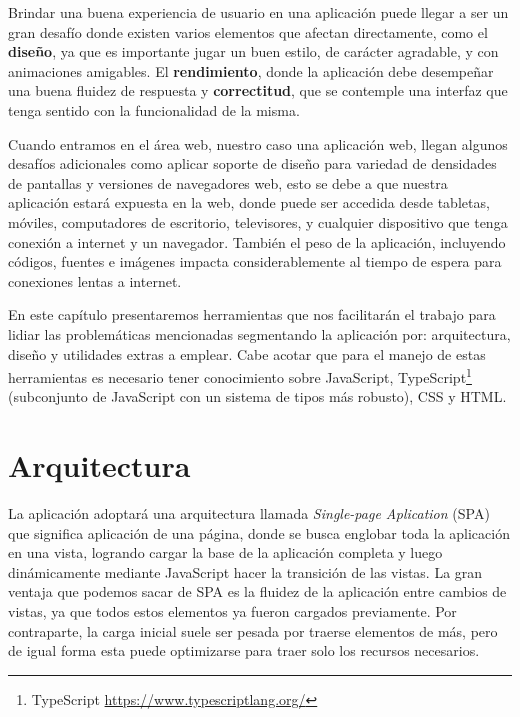 Brindar una buena experiencia de usuario en una aplicación puede llegar a ser un gran desafío donde existen varios elementos que afectan directamente, como el \textbf{diseño}, ya que es importante jugar un buen estilo, de carácter agradable, y con animaciones amigables. El \textbf{rendimiento}, donde la aplicación debe desempeñar una buena fluidez de respuesta y \textbf{correctitud}, que se contemple una interfaz que tenga sentido con la funcionalidad de la misma.

Cuando entramos en el área web, nuestro caso una aplicación web, llegan algunos desafíos adicionales como aplicar soporte de diseño para variedad de densidades de pantallas y versiones de navegadores web, esto se debe a que nuestra aplicación estará expuesta en la web, donde puede ser accedida desde tabletas, móviles, computadores de escritorio, televisores, y cualquier dispositivo que tenga conexión a internet y un navegador. También el peso de la aplicación, incluyendo códigos, fuentes e imágenes impacta considerablemente al tiempo de espera para conexiones lentas a internet.

En este capítulo presentaremos herramientas que nos facilitarán el trabajo para lidiar las problemáticas mencionadas segmentando la aplicación por: arquitectura, diseño y utilidades extras a emplear. Cabe acotar que para el manejo de estas herramientas es necesario tener conocimiento sobre JavaScript, TypeScript\footnote{TypeScript \url{https://www.typescriptlang.org/}} (subconjunto de JavaScript con un sistema de tipos más robusto), CSS y HTML.

\section{Arquitectura}

La aplicación adoptará una arquitectura llamada \textit{Single-page Aplication} \cite{WikiSPA} (SPA) que significa aplicación de una página, donde se busca englobar toda la aplicación en una vista, logrando cargar la base de la aplicación completa y luego dinámicamente mediante JavaScript hacer la transición de las vistas. La gran ventaja que podemos sacar de SPA es la fluidez de la aplicación entre cambios de vistas, ya que todos estos elementos ya fueron cargados previamente. Por contraparte, la carga inicial suele ser pesada por traerse elementos de más, pero de igual forma esta puede optimizarse para traer solo los recursos necesarios.

